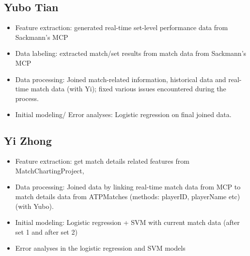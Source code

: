 \documentclass[paper=a4, fontsize=11pt]{scrartcl} %
\numberwithin{equation}{section} %
\numberwithin{figure}{section} %
\numberwithin{table}{section} %
\begin{document}
\subsection{Yubo Tian}
\begin{itemize}
\item Feature extraction:  generated real-time set-level performance data from Sackmann's MCP
\cite{tennis_charting}
\item Data labeling: extracted match/set results from match data from Sackmann's MCP 
\cite{tennis_charting}
\item Data processing: Joined match-related information, historical data and real-time match data (with Yi); fixed various issues encountered during the process.
\item Initial modeling/ Error analyses: Logistic regression on final joined data.
\end{itemize}

\subsection{Yi Zhong}
\begin{itemize}
\item Feature extraction: get match details related features from MatchChartingProject, 
\item Data processing: Joined data by linking real-time match data from MCP \cite{tennis_charting} to match details data from ATPMatches \cite{tennis_atp} (methods: playerID, playerName etc) (with Yubo).
\item Initial modeling: Logistic regression + SVM with current match data (after set 1 and after set 2)
\item Error analyses in the logistic regression and SVM models
\end{itemize}


 
\end{document}
